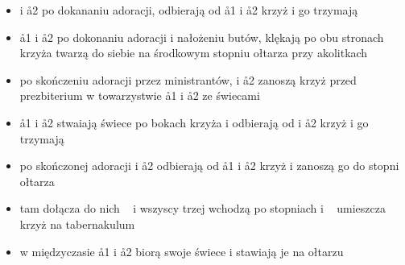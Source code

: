 \begin{itemize}
    \item {} i \aa2 po dokananiu adoracji, odbierają od \aa1 i \aa2 krzyż i go
          trzymają
    \item \aa1 i \aa2 po dokonaniu adoracji i nałożeniu butów, klękają po obu
          stronach krzyża twarzą do siebie na środkowym stopniu ołtarza przy
          akolitkach
    \item po skończeniu adoracji przez ministrantów,  i \aa2 zanoszą krzyż
          przed prezbiterium w towarzystwie \aa1 i \aa2 ze świecami
    \item \aa1 i \aa2 stwaiają świece po bokach krzyża i odbierają od  i
          \aa2 krzyż i go trzymają
    \item po skończonej adoracji  i \aa2 odbierają od \aa1 i \aa2 krzyż i
          zanoszą go do stopni ołtarza
    \item tam dołącza do nich \ii~ i wszyscy trzej wchodzą po stopniach i \ii~
          umieszcza krzyż na tabernakulum
    \item w międzyczasie \aa1 i \aa2 biorą swoje świece i stawiają je na ołtarzu
\end{itemize}

